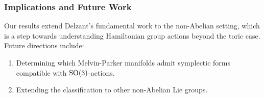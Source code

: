 \subsubsection*{Implications and Future Work}
Our results extend Delzant's fundamental work to the non-Abelian setting, which is a step towards understanding Hamiltonian group actions beyond the toric case. Future directions include:
\begin{enumerate}
\item Determining which Melvin-Parker manifolds admit symplectic forms compatible with $\rm{SO}(3)$-actions.
\item Extending the classification to other non-Abelian Lie groups.
\end{enumerate}